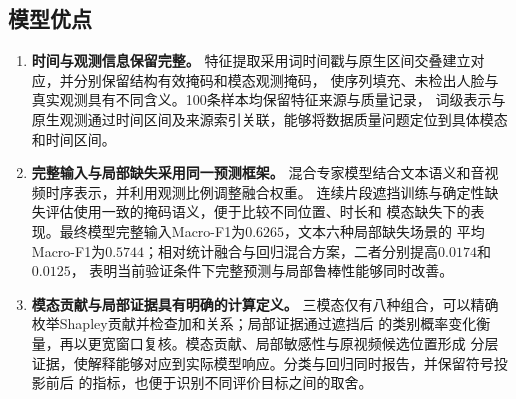 \documentclass[bwprint]{gmcmthesis}
\begin{document}
\subsection{模型优点}
\begin{enumerate}
 \item \textbf{时间与观测信息保留完整。}
 特征提取采用词时间戳与原生区间交叠建立对应，并分别保留结构有效掩码和模态观测掩码，
 使序列填充、未检出人脸与真实观测具有不同含义。100条样本均保留特征来源与质量记录，
 词级表示与原生观测通过时间区间及来源索引关联，能够将数据质量问题定位到具体模态和时间区间。

 \item \textbf{完整输入与局部缺失采用同一预测框架。}
 混合专家模型结合文本语义和音视频时序表示，并利用观测比例调整融合权重。
 连续片段遮挡训练与确定性缺失评估使用一致的掩码语义，便于比较不同位置、时长和
 模态缺失下的表现。最终模型完整输入Macro-F1为$0.6265$，文本六种局部缺失场景的
 平均Macro-F1为$0.5744$；相对统计融合与回归混合方案，二者分别提高$0.0174$和$0.0125$，
 表明当前验证条件下完整预测与局部鲁棒性能够同时改善。

 \item \textbf{模态贡献与局部证据具有明确的计算定义。}
 三模态仅有八种组合，可以精确枚举Shapley贡献并检查加和关系；局部证据通过遮挡后
 的类别概率变化衡量，再以更宽窗口复核。模态贡献、局部敏感性与原视频候选位置形成
 分层证据，使解释能够对应到实际模型响应。分类与回归同时报告，并保留符号投影前后
 的指标，也便于识别不同评价目标之间的取舍。
\end{enumerate}
\end{document}
